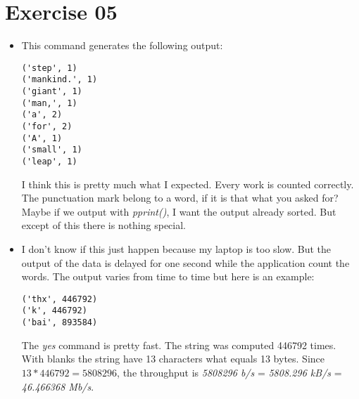 \documentclass[11pt,a4paper]{scrartcl}
\begin{document}
\section*{Exercise 05}

\begin{itemize}
\item[a)] This command generates the following output:
\begin{lstlisting}
('step', 1)
('mankind.', 1)
('giant', 1)
('man,', 1)
('a', 2)
('for', 2)
('A', 1)
('small', 1)
('leap', 1)
\end{lstlisting}
I think this is pretty much what I expected. Every work is counted correctly. The punctuation mark belong to a word, if it is that what you asked for? Maybe if we output with \textit{pprint()}, I want the output already sorted. But except of this there is nothing special.
\item[b)] I don't know if this just happen because my laptop is too slow. But the output of the data is delayed for one second while the application count the words. The output varies from time to time but here is an example:
\begin{lstlisting}
('thx', 446792)
('k', 446792)
('bai', 893584)
\end{lstlisting}
The \textit{yes} command is pretty fast. The string was computed 446792 times. With blanks the string have 13 characters what equals 13 bytes. Since $13 * 446792 = 5808296$, the throughput is \textit{5808296 b/s} = \textit{5808.296 kB/s} = \textit{46.466368 Mb/s}.
\end{itemize}
\end{document}
